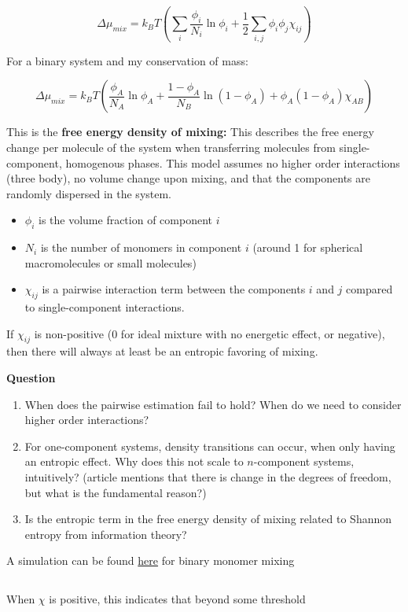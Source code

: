 \documentclass{article}
\begin{document}
\[\Delta\mu_{mix}=k_B T\left( \sum_i \frac{\phi_i}{N_i}\ln \phi_i + \frac{1}{2}\sum_{i,j} \phi_i \phi_j \chi_{ij}\right)\]

For a binary system and my conservation of mass:

\[\Delta\mu_{mix}=k_B T\left( \frac{\phi_A}{N_A}\ln \phi_A + \frac{1-\phi_A}{N_B}\ln (1-\phi_A) + \phi_A (1-\phi_A) \chi_{AB}\right)\]

This is the \textbf{free energy density of mixing:} This describes the free energy change per molecule of the system when transferring molecules from single-component, homogenous phases. This model assumes no higher order interactions (three body), no volume change upon mixing, and that the components are randomly dispersed in the system.

\begin{itemize}
    \item $\phi_i$ is the volume fraction of component $i$
    \item $N_i$ is the number of monomers in component $i$ (around 1 for spherical macromolecules or small molecules)
    \item $\chi_{ij}$ is a pairwise interaction term between the components $i$ and $j$ compared to single-component interactions.
\end{itemize}

If $\chi_{ij}$ is non-positive (0 for ideal mixture with no energetic effect, or negative), then there will always at least be an entropic favoring of mixing.

\textbf{Question}

\begin{enumerate}
    \item When does the pairwise estimation fail to hold? When do we need to consider higher order interactions?
    \item For one-component systems, density transitions can occur, when only having an entropic effect. Why does this not scale to $n$-component systems, intuitively? (article mentions that there is change in the degrees of freedom, but what is the fundamental reason?)
    \item Is the entropic term in the free energy density of mixing related to Shannon entropy from information theory?
\end{enumerate}

A simulation can be found \href{https://www.desmos.com/calculator/0n2oervaub}{here} for binary monomer mixing
\subsection{}

When $\chi$ is positive, this indicates that beyond some threshold 
\end{document}
